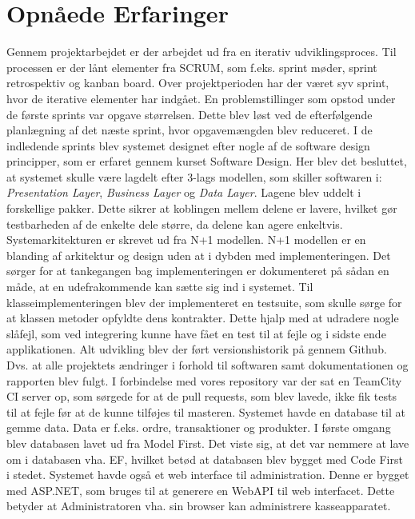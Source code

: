 \section{Opnåede Erfaringer}
Gennem projektarbejdet er der arbejdet ud fra en iterativ udviklingsproces. Til processen er der lånt elementer fra SCRUM, som f.eks. sprint møder, sprint retrospektiv og kanban board. Over projektperioden har der været syv sprint, hvor de iterative elementer har indgået. En problemstillinger som opstod under de første sprints var opgave størrelsen. Dette blev løst ved de efterfølgende planlægning af det næste sprint, hvor opgavemængden blev reduceret.
\newline\newline
I de indledende sprints blev systemet designet efter nogle af de software design principper, som er erfaret gennem kurset Software Design. Her blev det besluttet, at systemet skulle være lagdelt efter 3-lags modellen, som skiller softwaren i: \textit{Presentation Layer}, \textit{Business Layer} og \textit{Data Layer}. Lagene blev uddelt i forskellige pakker. Dette sikrer at koblingen mellem delene er lavere, hvilket gør testbarheden af de enkelte dele større, da delene kan agere enkeltvis.
\newline\newline
Systemarkitekturen er skrevet ud fra N+1 modellen. N+1 modellen er en blanding af arkitektur og design uden at i dybden med implementeringen. Det sørger for at tankegangen bag implementeringen er dokumenteret på sådan en måde, at en udefrakommende kan sætte sig ind i systemet.
\newline\newline 
Til klasseimplementeringen blev der implementeret en testsuite, som skulle sørge for at klassen metoder opfyldte dens kontrakter. Dette hjalp med at udradere nogle slåfejl, som ved integrering kunne have fået en test til at fejle og i sidste ende applikationen.
\newline\newline
Alt udvikling blev der ført versionshistorik på gennem Github. Dvs. at alle projektets ændringer i forhold til softwaren samt dokumentationen og rapporten blev fulgt. I forbindelse med vores repository var der sat en TeamCity CI server op, som sørgede for at de pull requests, som blev lavede, ikke fik tests til at fejle før at de kunne tilføjes til masteren.
\newline\newline
Systemet havde en database til at gemme data. Data er f.eks. ordre, transaktioner og produkter. I første omgang blev databasen lavet ud fra Model First. Det viste sig, at det var nemmere at lave om i databasen vha. EF, hvilket betød at databasen blev bygget med Code First i stedet.
\newline\newline
Systemet havde også et web interface til administration. Denne er bygget med ASP.NET, som bruges til at generere en WebAPI til web interfacet. Dette betyder at Administratoren vha. sin browser kan administrere kasseapparatet.
